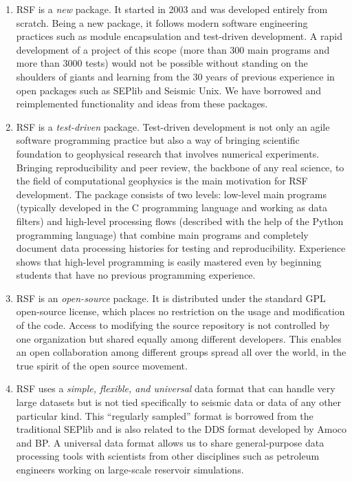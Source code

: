 \begin{enumerate}

\item RSF is a \emph{new} package. It started in 2003 and was
developed entirely from scratch. Being a new package, it follows
modern software engineering practices such as module encapsulation and
test-driven development. A rapid development of a project of this
scope (more than 300 main programs and more than 3000 tests) would not
be possible without standing on the shoulders of giants and learning
from the 30 years of previous experience in open packages such as
SEPlib and Seismic Unix. We have borrowed and reimplemented
functionality and ideas from these packages.

\item RSF is a \emph{test-driven} package. Test-driven development is
not only an agile software programming practice but also a way of
bringing scientific foundation to geophysical research that involves
numerical experiments. Bringing reproducibility and peer review, the
backbone of any real science, to the field of computational geophysics
is the main motivation for RSF development. The package consists of
two levels: low-level main programs (typically developed in the C
programming language and working as data filters) and high-level
processing flows (described with the help of the Python programming
language) that combine main programs and completely document data
processing histories for testing and reproducibility. Experience
shows that high-level programming is easily mastered even by beginning
students that have no previous programming experience.

\item RSF is an \emph{open-source} package. It is distributed under
the standard GPL open-source license, which places no restriction on
the usage and modification of the code. Access to modifying the source
repository is not controlled by one organization but shared equally
among different developers. This enables an open collaboration among
different groups spread all over the world, in the true spirit of the
open source movement.

\item RSF uses a \emph{simple, flexible, and universal} data format
that can handle very large datasets but is not tied specifically to
seismic data or data of any other particular kind. This ``regularly
sampled'' format is borrowed from the traditional SEPlib and is also
related to the DDS format developed by Amoco and BP. A universal data
format allows us to share general-purpose data processing tools with
scientists from other disciplines such as petroleum engineers working
on large-scale reservoir simulations.

\end{enumerate}

